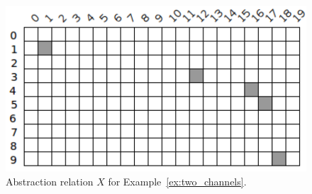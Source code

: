 \begin{example}
	\begin{figure}[ht]
		\centering
		\includegraphics[scale=0.65]{Figures/PDF/Relview/XR.pdf}
		\caption{Abstraction relation $X$ for Example~\ref{ex:two_channels}.}
		\label{fig:two_channels_x}
	\end{figure}
	
	\newpage
\end{example}